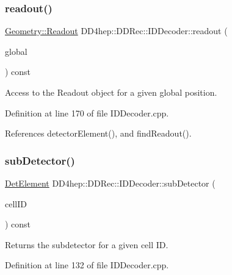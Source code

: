 \subsubsection{\texorpdfstring{readout()}{readout()}\hspace{0.1cm}{\footnotesize\ttfamily [2/2]}}
{\footnotesize\ttfamily \hyperlink{class_d_d4hep_1_1_geometry_1_1_readout}{Geometry\+::\+Readout} D\+D4hep\+::\+D\+D\+Rec\+::\+I\+D\+Decoder\+::readout (\begin{DoxyParamCaption}\item[{const \hyperlink{namespace_d_d4hep_1_1_geometry_a55083902099d03506c6db01b80404900}{Geometry\+::\+Position} \&}]{global }\end{DoxyParamCaption}) const}



Access to the Readout object for a given global position. 



Definition at line 170 of file I\+D\+Decoder.\+cpp.



References detector\+Element(), and find\+Readout().

\hypertarget{class_d_d4hep_1_1_d_d_rec_1_1_i_d_decoder_a3d8d0f881174f1d26284148abcbc9a69}{}\label{class_d_d4hep_1_1_d_d_rec_1_1_i_d_decoder_a3d8d0f881174f1d26284148abcbc9a69} 
\subsubsection{\texorpdfstring{sub\+Detector()}{subDetector()}\hspace{0.1cm}{\footnotesize\ttfamily [1/2]}}
{\footnotesize\ttfamily \hyperlink{class_d_d4hep_1_1_geometry_1_1_det_element}{Det\+Element} D\+D4hep\+::\+D\+D\+Rec\+::\+I\+D\+Decoder\+::sub\+Detector (\begin{DoxyParamCaption}\item[{const \hyperlink{namespace_d_d4hep_1_1_d_d_rec_af5cecc2e566eeaedb430b92df23971d4}{Cell\+ID} \&}]{cell\+ID }\end{DoxyParamCaption}) const}



Returns the subdetector for a given cell ID. 



Definition at line 132 of file I\+D\+Decoder.\+cpp.



